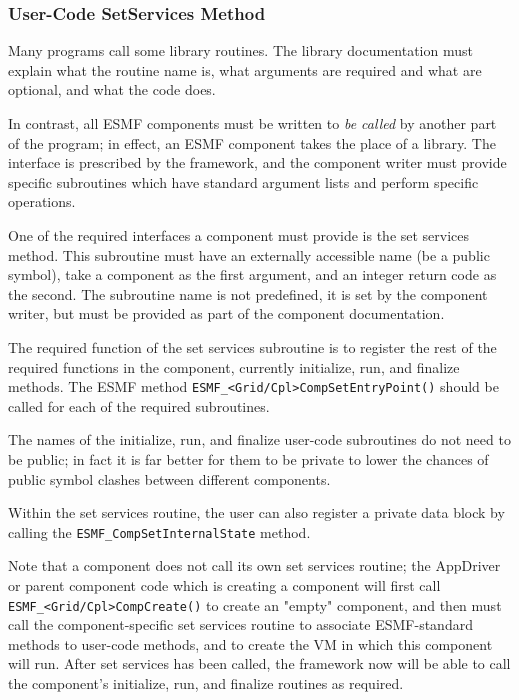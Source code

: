 %

\subsubsection{User-Code SetServices Method}

Many programs call some library routines.  The library
documentation must explain what the routine name is, what arguments 
are required and what are optional, and what the code does.  

In contrast, all ESMF components must be written to {\it be called}
by another part of the program; in effect, an ESMF component takes the 
place of a library.  The interface is prescribed by the framework,
and the component writer must provide specific subroutines which 
have standard argument lists and perform specific operations.

One of the required interfaces a component must provide is 
the set services method.  This subroutine must have an
externally accessible name (be a public symbol), take a component
as the first argument, and an integer return code as the second.
The subroutine name is not predefined, it is set by the component
writer, but must be provided as part of the component documentation.

The required function of the set services subroutine is to
register the rest of the required functions in the component,
currently initialize, run, and finalize methods.  The ESMF method
{\tt ESMF\_<Grid/Cpl>CompSetEntryPoint()} should be called for
each of the required subroutines.  

The names of the initialize, run, and finalize user-code 
subroutines do not need to be public; in fact it is far better 
for them to be private to lower the chances of public symbol clashes 
between different components.

Within the set services routine, the user can also register a 
private data block by calling the {\tt ESMF\_<Grid|Cpl>CompSetInternalState} 
method.

Note that a component does not call its own set services routine;
the AppDriver or parent component code which is creating a component 
will first call {\tt ESMF\_<Grid/Cpl>CompCreate()} to create an "empty" 
component, and then must call the component-specific set services routine 
to associate ESMF-standard methods to user-code methods, and to create
the VM in which this component will run. After set 
services has been called, the framework
now will be able to call the component's initialize, run, and finalize 
routines as required.  

